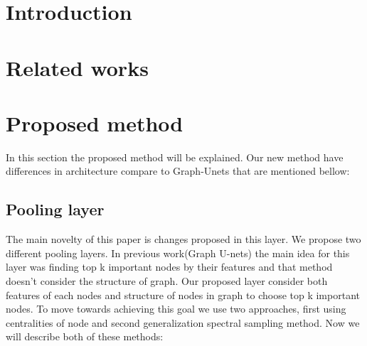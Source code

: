 \documentclass[nohyperref]{article}
\theoremstyle{plain}
\theoremstyle{definition}
\theoremstyle{remark}
\begin{document}
\printAffiliationsAndNotice{\icmlEqualContribution} %

\begin{abstract}
\end{abstract}

\section{Introduction}
\section{Related works}
\section{Proposed method}
In this section the proposed method will be explained. Our new method have differences in architecture compare to Graph-Unets that are mentioned bellow:
\subsection{Pooling layer}
The main novelty of this paper is changes proposed in this layer. We propose two different pooling layers. In previous work(Graph U-nets) the main idea for this layer was finding top k important nodes by their features and that method doesn't consider the structure of graph. Our proposed layer consider both features of each nodes and structure of nodes in graph to choose top k important nodes. To move towards achieving this goal we use two approaches, first using centralities of node and second generalization spectral sampling method. Now we will describe both of these methods:
\end{document}

